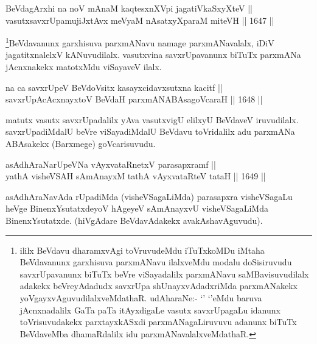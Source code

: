 \begin{shl}
BeVdagArxhi na noV mAnaM kaqtesxnXV\s pi jagatiVkaSxyXteV ||  \\
vasutxsavxrUpamujiJxtAvx meVyaM nAsatxyXparaM miteVH ||  1647 ||  
\end{shl}

\begin{artha}
\footnote{ililx BeVdavu dharamxvAgi toVruvudeMdu iTuTxkoMDu iMtaha BeVdavanunx garxhisuva parxmANavu ilalxveMdu modalu doSisiruvudu savxrUpavanunx biTuTx beVre viSayadalilx parxmANavu saMBavisuvudilalx adakekx beVreyAdadudx savxrUpa shUnayxvAdadxriMda parxmANakekx yoVgayxvAguvudilalxveMdathaR. udAharaNe:- `\stext' `\stext'eMdu baruva jAcnxnadalilx GaTa paTa itAyxdigaLe vasutx savxrUpagaLu idanunx toVrisuvudakekx parxtayxkASxdi parxmANagaLiruvuvu adanunx biTuTx BeVdaveMba dhamaRdalilx idu parxmANavalalxveMdathaR.}BeVdavanunx garxhisuva parxmANavu namage parxmANavalalx, iDiV jagatitxnalelxV kANuvudilalx. vasutxvina savxrUpavanunx biTuTx parxmANa jAcnxnakekx matotxMdu viSayaveV ilalx.
\end{artha}


\begin{shl}
na ca savxrUpeV BeVdoV\s sitx kasayxcidavxsutxna kacitf || \\
savxrUpAcAcxnayxtoV BeVdaH parxmANABAsagoVcaraH ||  1648 ||  
\end{shl}

\begin{artha}
matutx vasutx savxrUpadalilx yAva vasutxvigU elilxyU BeVdaveV iruvudilalx. savxrUpadiMdalU beVre viSayadiMdalU BeVdavu toVridalilx adu parxmANa ABAsakekx (Barxmege) goVcarisuvudu.
\end{artha}


\begin{shl}
asAdhAraNarUpeVNa vAyxvataRnetxV parasapxramf || \\
yathA visheVSAH sAmAnayxM tathA vAyxvataRteV tataH ||  1649 ||  
\end{shl}

\begin{artha}
asAdhAraNavAda rUpadiMda (visheVSagaLiMda) parasapxra visheVSagaLu heVge BinenxYsutatxdeyoV hAgeyeV sAmAnayxvU visheVSagaLiMda BinenxYsutatxde. (hiVgAdare BeVdavAdakekx avakAshavAguvudu).
\end{artha}

